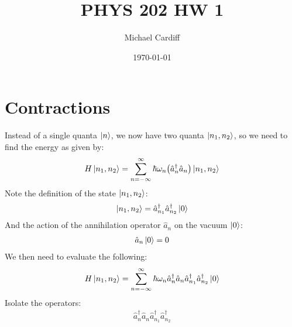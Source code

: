 \documentclass[12pt]{article}
\title{\vspace{-3em}PHYS 202 HW 1}
\author{Michael Cardiff}
\date{\today}
\begin{document}
\maketitle
\section{Contractions}
Instead of a single quanta $\ket{n}$, we now have two quanta $\ket{n_1,n_2}$, so we need to find the energy as given by:
\begin{align*}
  H\ket{n_1,n_2}=\sum_{n=-\infty}^\infty\hbar\omega_n
  \qty(\hat{a}_n^\dag\hat{a}_n)\ket{n_1,n_2}
\end{align*}
Note the definition of the state $\ket{n_1,n_2}$:
\begin{align*}
  \ket{n_1,n_2}=\hat{a}^\dag_{n_1}\hat{a}^\dag_{n_2}\ket{0}
\end{align*}
And the action of the annihilation operator $\hat{a}_n$ on the vacuum $\ket{0}$:
\begin{align*}
  \hat{a}_{n}\ket{0}=0
\end{align*}
We then need to evaluate the following:
\begin{align*}
  H\ket{n_1,n_2}=\sum_{n=-\infty}^\infty\hbar\omega_n
  \hat{a}_n^\dag\hat{a}_n\hat{a}^\dag_{n_1}\hat{a}^\dag_{n_2}\ket{0}
\end{align*}
Isolate the operators:
\begin{align*}
  \hat{a}_n^\dag\hat{a}_n\hat{a}^\dag_{n_1}\hat{a}^\dag_{n_2}
\end{align*}
\end{document}
